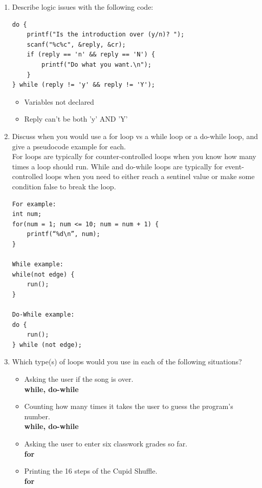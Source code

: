 \documentclass[letter,11pt]{article}
\begin{document}
\begin{enumerate}
    \item Describe logic issues with the following code:
\begin{verbatim}
do {
    printf("Is the introduction over (y/n)? ");
    scanf("%c%c", &reply, &cr);
    if (reply == 'n' && reply == 'N') {
        printf("Do what you want.\n");
    }
} while (reply != 'y' && reply != 'Y');
\end{verbatim}
\begin{itemize}
        \item Variables not declared
        \item Reply can't be both 'y' AND 'Y'
    \end{itemize}

    \item Discuss when you would use a for loop vs a while loop or a do-while loop, and give a pseudocode example for each. \\
    For loops are typically for counter-controlled loops when you know how many times a loop should run. While and do-while loops are typically for event-controlled loops when you need to either reach a sentinel value or make some condition false to break the loop. 
    \begin{verbatim}
For example:
int num;
for(num = 1; num <= 10; num = num + 1) {
    printf(“%d\n”, num);
}

While example:
while(not edge) {
    run();
}

Do-While example:
do {
    run();
} while (not edge);
    \end{verbatim}
    
    \item Which type(s) of loops would you use in each of the following situations?
    \begin{itemize}
        \item Asking the user if the song is over. \\
            \textbf{while, do-while}
        \item Counting how many times it takes the user to guess the program's number. \\
            \textbf{while, do-while}
        \item Asking the user to enter six classwork grades so far. \\
            \textbf{for}
        \item Printing the 16 steps of the Cupid Shuffle. \\
            \textbf{for}
    \end{itemize}
    

\end{enumerate}
\end{document}
